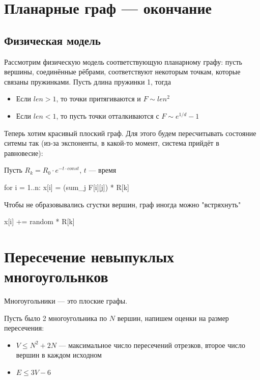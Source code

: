 
\section{Планарные граф --- окончание}

\subsection{Физическая модель}

Рассмотрим физическую модель соответствующую планарному графу:
пусть вершины, соединённые рёбрами, соответствуют некоторым точкам,
которые связаны пружинками. Пусть длина пружинки 1, тогда 

\begin{itemize}
    \item Если $len > 1$, то точки притягиваются и $F \sim len^2$
    \item Если $len < 1$, то пусть точки отталкиваются с $F \sim e^{1/d} - 1$
\end{itemize}

Теперь хотим красивый плоский граф. Для этого будем пересчитывать состояние
ситемы так (из-за экспоненты, в какой-то момент, система прийдёт в равновесие):

Пусть $R_k = R_0 \cdot e^{-t \cdot const}$, $t$ --- время
\begin{cppcode}
    for i = 1..n:
        x[i] = (sum_j F[i][j]) * R[k]
\end{cppcode}

Чтобы не образовывались сгустки вершин, граф иногда можно "встряхнуть"
\begin{cppcode}
    x[i] += random * R[k]
\end{cppcode}

\section{Пересечение невыпуклых многоугольнков}

Многоугольники --- это плоские графы.

Пусть было 2 многоугольника по $N$ вершин, напишем оценки на размер пересечения:

\begin{itemize}
    \item $V \leq N^2 + 2N$ --- максимальное число пересечений отрезков,
        второе число вершин в каждом исходном
    \item $E \leq 3V - 6$
\end{itemize}

